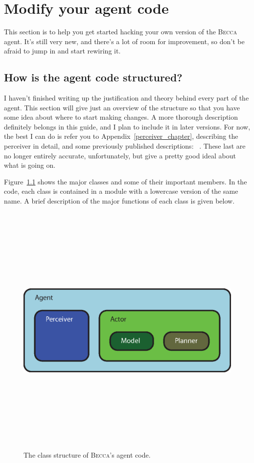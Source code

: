 \chapter{Modify your agent code}

This section is to help you get started hacking your own version of the \textsc{Becca} agent. It's still very new, and there's a lot of room for improvement, so don't be afraid to jump in and start rewiring it.

\section{How is the agent code structured?}

I haven't finished writing up the justification and theory behind every part of the agent. This section will give just an overview of the structure so that you have some idea about where to start making changes. A more thorough description definitely belongs in this guide, and I plan to include it in later versions. For now, the best I can do is refer you to Appendix~\ref{perceiver_chapter}, describing the perceiver in detail, and some previously published descriptions: ~\cite{rohrer11b,rohrer11c}. These last are no longer entirely accurate, unfortunately, but give a pretty good ideal about what is going on.

Figure~\ref{class_structure} shows the major classes and some of their important members. In the code, each class is contained in a module with a lowercase version of the same name. A brief description of the major functions of each class is given below.

\begin{figure}
\centering
\includegraphics[height=12.7cm]{figs/class_structure.eps}
\caption{The class structure of \textsc{Becca}'s agent code.}
\label{class_structure}
\end{figure}

